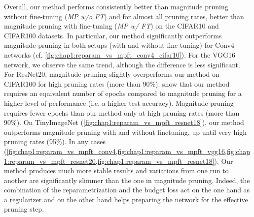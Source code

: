 Overall, our method performs consistently better than magnitude pruning without
fine-tuning (\emph{MP w/o FT}) and for almost all pruning rates, better than
magnitude pruning with fine-tuning (\emph{MP w/ FT}) on the CIFAR10 and CIFAR100
datasets. In particular, our method significantly outperforms magnitude pruning
in both setups (with and without fine-tuning) for Conv4 networks (cf.
\cref{fig:chap1:reparam_vs_mpft_conv4_cifar10}). For the VGG16 network, we
observe the same trend, although the difference is less significant. For
ResNet20, magnitude pruning slightly overperforms our method on CIFAR100 for
high pruning rates (more than 90\%).
show that our method requires an equivalent number of epochs compared to
magnitude pruning for a higher level of performance (i.e. a higher test
accuracy). Magnitude pruning requires fewer epochs than our method only at high
pruning rates (more than 90\%). On TinyImageNet
(\cref{fig:chap1:reparam_vs_mpft_resnet18}), our method outperforms magnitude
pruning with and without finetuning, up until very high pruning rates (95\%). In
any cases
(\cref{fig:chap1:reparam_vs_mpft_conv4,fig:chap1:reparam_vs_mpft_vgg16,fig:chap1:reparam_vs_mpft_resnet20,fig:chap1:reparam_vs_mpft_resnet18}),
Our method produces much more stable results and variations from one run to
another are significantly slimmer than the one in magnitude pruning. Indeed, the
combination of the reparametrization and the budget loss act on the one hand as
a regularizer and on the other hand helps preparing the network for the
effective pruning step.\\

